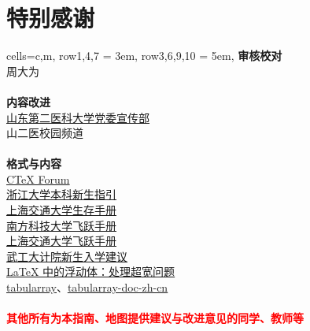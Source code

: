 \chapter*{特别感谢}
\begin{tblr}[
    long,
    theme=no-caption
    ]{
    cells={c,m},
    row{1,4,7} = {3em},
    row{3,6,9,10} = {5em},}
    {\large\textbf{审核校对}}                                                                                           \\
    {周大为}                                                                                                            \\
    \\
    {\large\textbf{内容改进}}                                                                                           \\
    {
    \uline{\href{https://xchb.sdsmu.edu.cn/}{山东第二医科大学党委宣传部}}                                               \\
    山二医校园频道
    }                                                                                                                   \\
    \\
    {\large\textbf{格式与内容}}                                                                                         \\
    {
    \uline{\href{https://github.com/CTeX-org/forum/issues}{CTeX Forum}}                                                 \\
    \uline{\href{https://zjuers.com/welcome/}{浙江大学本科新生指引}}                                                    \\
    \uline{\href{https://survivesjtu.gitbook.io/survivesjtumanual}{上海交通大学生存手册}}                               \\
    \uline{\href{https://sustech-application.com/}{南方科技大学飞跃手册}}                                               \\
    \uline{\href{https://survivesjtu.github.io/SJTU-Application/}{上海交通大学飞跃手册}}                                \\
    \uline{\href{https://gitee.com/hanyaner/witjij}{武工大计院新生入学建议}}                                            \\
    \uline{\href{https://liam.page/2017/03/22/floats-in-LaTeX-handle-overfull-floats/}{LaTeX 中的浮动体：处理超宽问题}} \\
    \uline{\href{https://github.com/lvjr/tabularray}{tabularray}}、\uline{\href{https://gitee.com/nwafu_nan/tabularray-doc-zh-cn}{tabularray-doc-zh-cn}}
    }                                                                                                                   \\
    \\
    {\large\textbf{\textcolor{red}{其他所有为本指南、地图提供建议与改进意见的同学、教师等}}}
\end{tblr}
